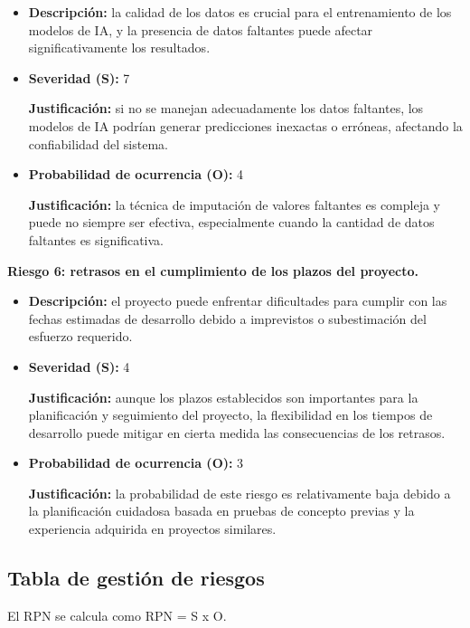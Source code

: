 \documentclass[
11pt, %
codirector, %
]{charter}
\begin{document}
\begin{itemize}
  \item \textbf{Descripción:} la calidad de los datos es crucial para el entrenamiento de los modelos de IA, y la presencia de datos faltantes puede afectar significativamente los resultados.
  \item \textbf{Severidad (S):} 7
  
  \textbf{Justificación:} si no se manejan adecuadamente los datos faltantes, los modelos de IA podrían generar predicciones inexactas o erróneas, afectando la confiabilidad del sistema.
  \item \textbf{Probabilidad de ocurrencia (O):} 4
  
  \textbf{Justificación:} la técnica de imputación de valores faltantes es compleja y puede no siempre ser efectiva, especialmente cuando la cantidad de datos faltantes es significativa.
\end{itemize}

\textbf{Riesgo 6: retrasos en el cumplimiento de los plazos del proyecto.}

\begin{itemize}
  \item \textbf{Descripción:} el proyecto puede enfrentar dificultades para cumplir con las fechas estimadas de desarrollo debido a imprevistos o subestimación del esfuerzo requerido.
  \item \textbf{Severidad (S):} 4
  
  \textbf{Justificación:} aunque los plazos establecidos son importantes para la planificación y seguimiento del proyecto, la flexibilidad en los tiempos de desarrollo puede mitigar en cierta medida las consecuencias de los retrasos.
  \item \textbf{Probabilidad de ocurrencia (O):} 3
  
  \textbf{Justificación:} la probabilidad de este riesgo es relativamente baja debido a la planificación cuidadosa basada en pruebas de concepto previas y la experiencia adquirida en proyectos similares.
\end{itemize}

\subsection{Tabla de gestión de riesgos}

El RPN se calcula como RPN = S x O.
\end{document}

